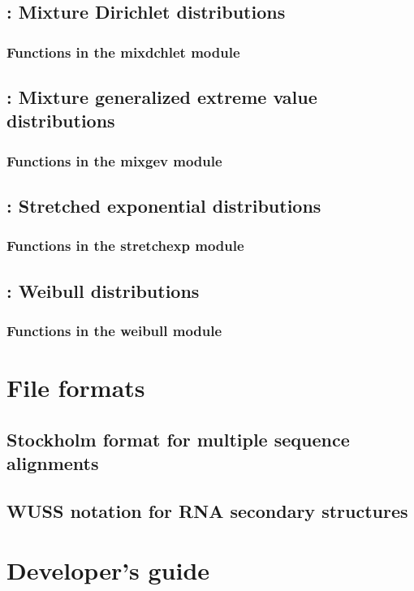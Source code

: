 \documentclass[10pt]{book}
\begin{document}
\newpage
\section{: Mixture Dirichlet distributions}
%
\subsection{Functions in the mixdchlet module}
%

\newpage
\section{: Mixture generalized extreme value distributions}
%
\subsection{Functions in the mixgev module}


\newpage
\section{: Stretched exponential distributions}

\subsection{Functions in the stretchexp module}


\newpage
\section{: Weibull distributions}

\subsection{Functions in the weibull module}







\newpage
\chapter{File formats}

\section{Stockholm format for multiple sequence alignments}




\newpage
\section{WUSS notation for RNA secondary structures}



\newpage
\chapter{Developer's guide}



\newpage
\newcommand{\bibfont}{\footnotesize}


\end{document}
